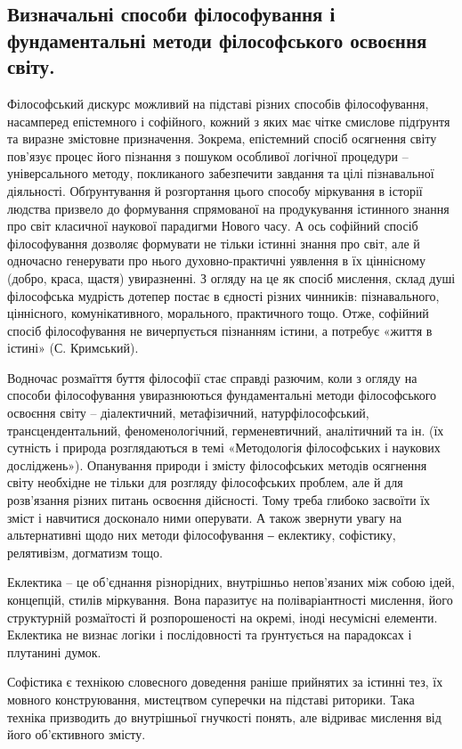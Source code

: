 \subsection[Способи та методи філософського освоєння світу.]{Визначальні способи філософування і фундаментальні методи філософського освоєння світу.} Філософський дискурс можливий на підставі
різних способів філософування, насамперед епістемного і софійного, кожний з
яких має чітке смислове підґрунтя та виразне змістовне призначення. Зокрема,
епістемний спосіб осягнення світу пов’язує процес його пізнання з пошуком
особливої логічної процедури – універсального методу, покликаного
забезпечити завдання та цілі пізнавальної діяльності. Обґрунтування й
розгортання цього способу міркування в історії людства призвело до
формування спрямованої на продукування істинного знання про світ класичної
наукової парадигми Нового часу. А ось софійний спосіб філософування
дозволяє формувати не тільки істинні знання про світ, але й одночасно
генерувати про нього духовно-практичні уявлення в їх ціннісному (добро,
краса, щастя) увиразненні. З огляду на це як спосіб мислення, склад душі
філософська мудрість дотепер постає в єдності різних чинників: пізнавального,
ціннісного, комунікативного, морального, практичного тощо. Отже, софійний
спосіб філософування не вичерпується пізнанням істини, а потребує «життя в
істині» (С. Кримський).

Водночас розмаїття буття філософії стає справді разючим, коли з огляду на
способи філософування увиразнюються фундаментальні методи філософського
освоєння світу – діалектичний, метафізичний, натурфілософський,
трансцендентальний, феноменологічний, герменевтичний, аналітичний та ін. (їх
сутність і природа розглядаються в темі «Методологія філософських і наукових
досліджень»). Опанування природи і змісту філософських методів осягнення
світу необхідне не тільки для розгляду філософських проблем, але й для
розв’язання різних питань освоєння дійсності. Тому треба глибоко засвоїти їх
зміст і навчитися досконало ними оперувати. А також звернути увагу на
альтернативні щодо них методи філософування ‒ еклектику, софістику,
релятивізм, догматизм тощо.

Еклектика – це об’єднання різнорідних, внутрішньо непов’язаних між
собою ідей, концепцій, стилів міркування. Вона паразитує на поліваріантності
мислення, його структурній розмаїтості й розпорошеності на окремі, іноді
несумісні елементи. Еклектика не визнає логіки і послідовності та ґрунтується
на парадоксах і плутанині думок.

Софістика є технікою словесного доведення раніше прийнятих за істинні
тез, їх мовного конструювання, мистецтвом суперечки на підставі риторики.
Така техніка призводить до внутрішньої гнучкості понять, але відриває
мислення від його об’єктивного змісту.

